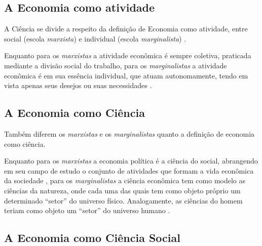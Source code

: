 \documentclass[
	12pt,				%
	oneside,			%
	a4paper,			%
	chapter=TITLE,		%
	section=TITLE,		%
	english,			%
	brazil				%
	]{abntex2}
\begin{document}
\begin{refsection}
\hypertarget{a-economia-como-atividade}{%
\subsection{A Economia como atividade}\label{a-economia-como-atividade}}

A Ciência se divide a respeito da definição de Economia como atividade, entre
social (escola \emph{marxista}) e individual (escola \emph{marginalista}) \autocite[9]{singer}.

Enquanto para os \emph{marxistas} a atividade econômica é sempre coletiva, praticada
mediante a divisão social do trabalho, para os \emph{marginalistas} a atividade
econômica é em sua essência individual, que atuam autonomamente, tendo em vista
apenas seus desejos ou suas necessidades \autocite[10]{singer}.

\hypertarget{a-economia-como-ciuxeancia}{%
\subsection{A Economia como Ciência}\label{a-economia-como-ciuxeancia}}

Também diferem os \emph{marxistas} e os \emph{marginalistas} quanto a definição de
economia como ciência.

Enquanto para os \emph{marxistas} a economia política é a ciência do social,
abrangendo em seu campo de estudo o conjunto de atividades que formam a vida
econômica da sociedade \autocite[14]{singer}, para os \emph{marginalistas} a
ciência econômica tem como modelo as ciências da natureza, onde cada uma das
quais tem como objeto próprio um determinado ``setor'' do universo físico.
Analogamente, as ciências do homem teriam como objeto um ``setor'' do universo
humano \autocite[15]{singer}.

\hypertarget{a-economia-como-ciuxeancia-social}{%
\subsection{A Economia como Ciência Social}\label{a-economia-como-ciuxeancia-social}}


\end{refsection}
\end{document}

